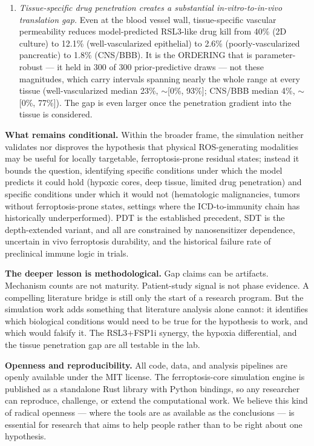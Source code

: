 \documentclass[11pt,twoside,openright]{report}
\begin{document}
\begin{enumerate}
\item \textit{Tissue-specific drug penetration creates a substantial in-vitro-to-in-vivo translation gap.} Even at the blood vessel wall, tissue-specific vascular permeability reduces model-predicted RSL3-like drug kill from 40\% (2D culture) to 12.1\% (well-vascularized epithelial) to 2.6\% (poorly-vascularized pancreatic) to 1.8\% (CNS/BBB). It is the ORDERING that is parameter-robust --- it held in 300 of 300 prior-predictive draws --- not these magnitudes, which carry intervals spanning nearly the whole range at every tissue (well-vascularized median 23\%, $\sim$[0\%, 93\%]; CNS/BBB median 4\%, $\sim$[0\%, 77\%]). The gap is even larger once the penetration gradient into the tissue is considered.
\end{enumerate}

\textbf{What remains conditional.} Within the broader frame, the simulation neither validates nor disproves the hypothesis that physical ROS-generating modalities may be useful for locally targetable, ferroptosis-prone residual states; instead it bounds the question, identifying specific conditions under which the model predicts it could hold (hypoxic cores, deep tissue, limited drug penetration) and specific conditions under which it would not (hematologic malignancies, tumors without ferroptosis-prone states, settings where the ICD-to-immunity chain has historically underperformed). PDT is the established precedent, SDT is the depth-extended variant, and all are constrained by nanosensitizer dependence, uncertain in vivo ferroptosis durability, and the historical failure rate of preclinical immune logic in trials.

\textbf{The deeper lesson is methodological.} Gap claims can be artifacts. Mechanism counts are not maturity. Patient-study signal is not phase evidence. A compelling literature bridge is still only the start of a research program. But the simulation work adds something that literature analysis alone cannot: it identifies which biological conditions would need to be true for the hypothesis to work, and which would falsify it. The RSL3+FSP1i synergy, the hypoxia differential, and the tissue penetration gap are all testable in the lab.

\textbf{Openness and reproducibility.} All code, data, and analysis pipelines are openly available under the MIT license. The ferroptosis-core simulation engine is published as a standalone Rust library with Python bindings, so any researcher can reproduce, challenge, or extend the computational work. We believe this kind of radical openness --- where the tools are as available as the conclusions --- is essential for research that aims to help people rather than to be right about one hypothesis.
\end{document}
